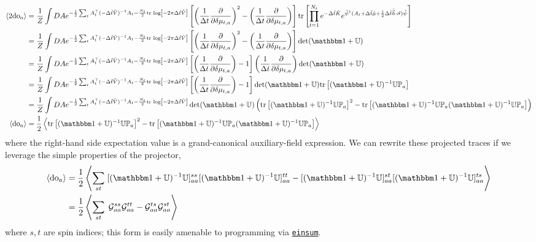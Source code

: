 \begin{align}
    \expectation{2\doubleOccupancy_a}
    &=
    \oneover{Z}\int DA e^{-\frac{1}{2} \sum_t A\transpose_t (-\Delta\tilde{t} \tilde{V})\inverse A_t - \frac{N_t}{2} \trlog{ -2\pi \Delta\tilde{t}\tilde{V}}}
    \left[\left(\oneover{\Delta t}\frac{\partial}{\partial \delta\mu_{t,a}}\right)^2 - \left(\oneover{\Delta t}\frac{\partial}{\partial \delta\mu_{t,a}}\right)\right]\tr{\prod_{t=1}^{N_t} e^{-\Delta \tilde{t}\tilde{K}}  e^{ \tilde{\psi}\adjoint (A_t + \Delta\tilde{t} \tilde{\mu} + \half \Delta\tilde{t} \tilde{\vec{h}}\cdot\vec{\sigma})\tilde{\psi}}}
    \nonumber\\
    &=
    \oneover{Z}\int DA e^{-\frac{1}{2} \sum_t A\transpose_t (-\Delta\tilde{t} \tilde{V})\inverse A_t - \frac{N_t}{2} \trlog{ -2\pi \Delta\tilde{t}\tilde{V}}}
    \left[\left(\oneover{\Delta t}\frac{\partial}{\partial \delta\mu_{t,a}}\right)^2 - \left(\oneover{\Delta t}\frac{\partial}{\partial \delta\mu_{t,a}}\right)\right] \det(\one + \UU)
    \nonumber\\
    &=
    \oneover{Z}\int DA e^{-\frac{1}{2} \sum_t A\transpose_t (-\Delta\tilde{t} \tilde{V})\inverse A_t - \frac{N_t}{2} \trlog{ -2\pi \Delta\tilde{t}\tilde{V}}}
    \left[\left(\oneover{\Delta t}\frac{\partial}{\partial \delta\mu_{t,a}}\right) - 1 \right] \left(\oneover{\Delta t}\frac{\partial}{\partial \delta\mu_{t,a}}\right) \det(\one + \UU)
    \nonumber\\
    &=
    \oneover{Z}\int DA e^{-\frac{1}{2} \sum_t A\transpose_t (-\Delta\tilde{t} \tilde{V})\inverse A_t - \frac{N_t}{2} \trlog{ -2\pi \Delta\tilde{t}\tilde{V}}}
    \left[\left(\oneover{\Delta t}\frac{\partial}{\partial \delta\mu_{t,a}}\right) - 1 \right] \det(\one + \UU) \tr{(\one + \UU)\inverse \UU \PP_a}
    \nonumber\\
    &=
    \oneover{Z}\int DA e^{-\frac{1}{2} \sum_t A\transpose_t (-\Delta\tilde{t} \tilde{V})\inverse A_t - \frac{N_t}{2} \trlog{ -2\pi \Delta\tilde{t}\tilde{V}}}
    \det( \one+\UU ) \left(\tr{(\one + \UU)\inverse \UU \PP_a}^2 - \tr{(\one+\UU)\inverse \UU \PP_a (\one+\UU)\inverse \UU \PP_a}\right)
    \nonumber\\
    \expectation{\doubleOccupancy_a}
    &=
    \half\expectation{\tr{(\one + \UU)\inverse \UU \PP_a}^2 - \tr{(\one+\UU)\inverse \UU \PP_a (\one+\UU)\inverse \UU \PP_a}}
    \label{eq:double occupancy}
\end{align}
where the right-hand side expectation value is a grand-canonical auxiliary-field expression.
We can rewrite these projected traces if we leverage the simple properties of the projector,
\begin{align}
    \expectation{\doubleOccupancy_a}
    &=
    \half\expectation{\sum_{st}\; [(\one + \UU)\inverse \UU]_{aa}^{ss} [(\one + \UU)\inverse \UU]_{aa}^{tt} - [(\one + \UU)\inverse \UU]_{aa}^{st} [(\one + \UU)\inverse \UU]_{aa}^{ts} }
    \nonumber\\
    &=
    \half\expectation{\sum_{st}\; \G_{aa}^{ss} \G_{aa}^{tt} - \G_{aa}^{ts} \G_{aa}^{st} }
\end{align}
where $s,t$ are spin indices; this form is easily amenable to programming via \href{https://pytorch.org/docs/stable/generated/torch.einsum.html}{\texttt{einsum}}.

